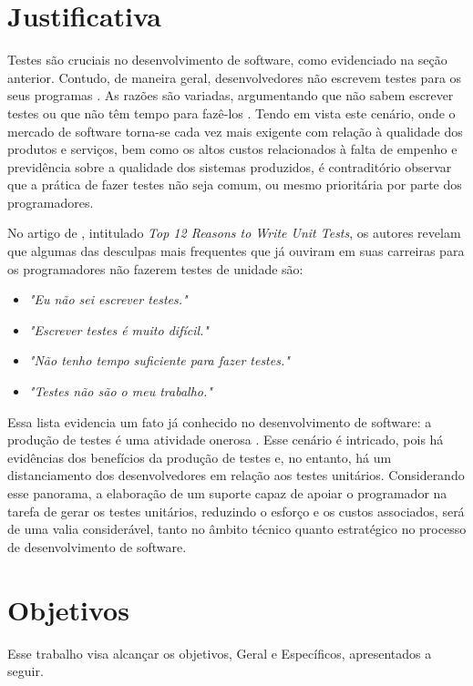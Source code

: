 \section{Justificativa}
Testes são cruciais no desenvolvimento de software, como evidenciado na seção
anterior. Contudo, de maneira geral, desenvolvedores não escrevem testes para
os seus programas \cite{burkeCoyner2003}. As razões são variadas, argumentando
que não sabem escrever testes ou que não têm tempo para fazê-los
\cite{burkeCoyner2003}. Tendo em vista este cenário, onde o mercado de
software torna-se cada vez mais exigente com relação à qualidade dos produtos
e serviços, bem como os altos custos relacionados à falta de empenho e
previdência sobre a qualidade dos sistemas produzidos, é contraditório
observar que a prática de fazer testes não seja comum, ou mesmo prioritária
por parte dos programadores.
\par
\indent No artigo de , intitulado
\textit{Top 12 Reasons to Write Unit Tests}, os autores revelam que algumas das
desculpas mais frequentes que já ouviram em suas carreiras para os
programadores não fazerem testes de unidade são:
  \begin{itemize}
    \item \textit{"Eu não sei escrever testes."}

    \item \textit{"Escrever testes é muito difícil."}

    \item \textit{"Não tenho tempo suficiente para fazer testes."}

    \item \textit{"Testes não são o meu trabalho."}
  \end{itemize}
\par
\indent Essa lista evidencia um fato já conhecido no desenvolvimento de
software: a produção de testes é uma atividade onerosa \cite{barbosaEtAl2009}.
Esse cenário é intricado, pois há evidências dos benefícios da produção de
testes e, no entanto, há um distanciamento dos desenvolvedores em relação aos
testes unitários. Considerando esse panorama, a elaboração de um suporte capaz
de apoiar o programador na tarefa de gerar os testes unitários, reduzindo o
esforço e os custos associados, será de uma valia considerável, tanto no âmbito
técnico quanto estratégico no processo de desenvolvimento de software.

\section{Objetivos}
Esse trabalho visa alcançar os objetivos, Geral e Específicos, apresentados a
seguir.

